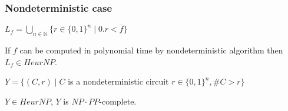 \begin{frame}
    \frametitle{Nondeterministic case}

    $L_f = \bigcup\limits_{n \in \mathbb{N}}\{r \in \{0, 1\}^n \mid 0.r <
    \overline{f}\}$

    \begin{lemma}
        If $f$ can be computed in polynomial time by nondeterministic
        algorithm then $L_f \in HeurNP$.
    \end{lemma}
    
	$Y = \{(C, r) \mid C$ is a nondeterministic circuit $r \in \{0,
    1\}^n, \#C > r\}$
    
    \begin{lemma}
        $Y \in HeurNP$, $Y$ is $NP \cdot PP$-complete.
    \end{lemma}
    
\end{frame}